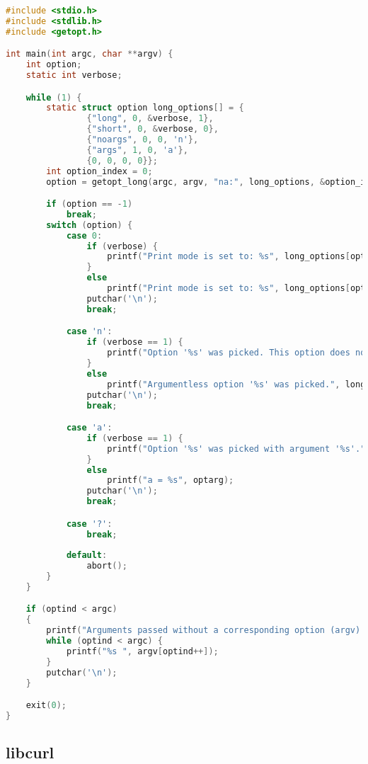\begin{lstlisting}[language=C, caption=Contoh sederhana penggunaan getopt-long, label=code:getopt-usage-long]
#include <stdio.h>
#include <stdlib.h>
#include <getopt.h>

int main(int argc, char **argv) {
    int option;
    static int verbose;

    while (1) {
        static struct option long_options[] = {
                {"long", 0, &verbose, 1},
                {"short", 0, &verbose, 0},
                {"noargs", 0, 0, 'n'},
                {"args", 1, 0, 'a'},
                {0, 0, 0, 0}};
        int option_index = 0;
        option = getopt_long(argc, argv, "na:", long_options, &option_index);

        if (option == -1)
            break;
        switch (option) {
	        case 0:
    	        if (verbose) {
	                printf("Print mode is set to: %s", long_options[option_index].name);
	            }
	            else
	                printf("Print mode is set to: %s", long_options[option_index].name);
	            putchar('\n');
	            break;

    	    case 'n':
	            if (verbose == 1) {
	                printf("Option '%s' was picked. This option does not require any arguments.", long_options[option_index].name);
    	        }
	            else
	                printf("Argumentless option '%s' was picked.", long_options[option_index].name);
	            putchar('\n');
	            break;

    	    case 'a':
	            if (verbose == 1) {
	                printf("Option '%s' was picked with argument '%s'.", long_options[option_index].name, optarg);
	            }
	            else
	                printf("a = %s", optarg);
	            putchar('\n');
	            break;

    	    case '?':
	            break;
	
	        default:
	            abort();
        }
    }

    if (optind < argc)
    {
        printf("Arguments passed without a corresponding option (argv): ");
        while (optind < argc) {
            printf("%s ", argv[optind++]);
        }
        putchar('\n');
    }

    exit(0);
}
\end{lstlisting}

\subsection{libcurl \cite{stenberg:2022:everythingcurl}}
\label{sec:cmodules-libcurl}

